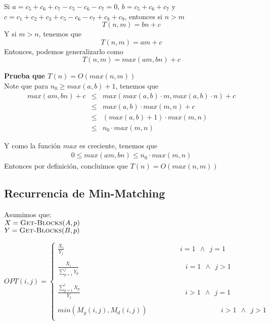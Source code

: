 \documentclass[12pt]{article}
\begin{document}
\noindent Si $a=c_5+c_6+c_7-c_5-c_6-c_7=0$, $b=c_5+c_6+c_7$ y $c=c_1+c_2+c_3+c_5-c_6-c_7+c_8+c_9$, entonces si $n>m$
$$T(n,m)=bn+c$$
Y si $m>n$, tenemos que
$$T(n,m)=am+c$$
Entonces, podemos generalizarlo como
$$T(n,m)=max(am,bn)+c$$


\noindent \textbf{Prueba que $T(n) = O(max(n,m))$} \\

\noindent Note que para $n_0\geq max(a,b)+1$, tenemos que 
\begin{eqnarray*}
max(am,bn)+c &\leq& max(max(a,b)\cdot m, max(a,b)\cdot n)+c \\
&\leq& max(a,b)\cdot max(m,n)+c \\
&\leq& (max(a,b)+1)\cdot max(m,n) \\
&\leq& n_0\cdot max(m,n)
\end{eqnarray*}

\noindent Y como la función $max$ es creciente, tenemos que
\begin{eqnarray*}
0\leq max(am,bn)\leq n_0\cdot max(m,n)
\end{eqnarray*}
\noindent Entonces por definición, concluimos que $T(n) = O(max(n,m))$

\subsection*{Recurrencia de Min-Matching}

\noindent Asumimos que:\\
$X = \textsc{Get-Blocks}(A,p)$ \\
$Y = \textsc{Get-Blocks}(B,p)$ 

\[
OPT(i,j)=\left\{
            \begin{array}{ll}
              \frac{X_i}{Y_j} \ \ \ \ \ \ \ \ \ \ \ \ \ \ \ \ \ \ \ \ \ \ \ \ \ \ \ \ \ \ \ \ \ \ \ \ \ \ \ \ \ \ \ \ \ \ \ \ \ \ \ \ \ \ \ \ \ \ \ \ \ \ \ \ \ \ \ \ \ \ \ \ \ \ i=1 \ \ \wedge \ \ j=1 \\ \\
              \frac{X_i}{\sum_{p=1}^{j}Y_p} \ \ \ \ \ \ \ \ \ \ \ \ \ \ \ \ \ \ \ \ \ \ \ \ \ \ \ \ \ \ \ \ \ \ \ \ \ \ \ \ \ \ \ \ \ \ \ \ \ \ \ \ \ \ \ \ \ \ \ \ \ \ \ \ \ \ \ \ i=1 \ \ \wedge \ \ j>1 \\ \\
              \frac{\sum_{p=1}^{i}X_p}{Y_j} \ \ \ \ \ \ \ \ \ \ \ \ \ \ \ \ \ \ \ \ \ \ \ \ \ \ \ \ \ \ \ \ \ \ \ \ \ \ \ \ \ \ \ \ \ \ \ \ \ \ \ \ \ \ \ \ \ \ \ \ \ \ \ \ \ \ \ i>1 \ \ \wedge \ \ j=1 \\ \\
              min(M_g(i,j), M_d(i,j)) \ \ \ \ \ \ \ \ \ \ \ \ \ \  \ \ \ \ \ \ \ \ \ \ \ \ \ \ \ \ \ \ \ \ \ \ \ \ \ \ \ \ \ \ \ \ \ i>1 \ \ \wedge \ \ j>1 \\
            \end{array}
          \right.
\]
\end{document}

